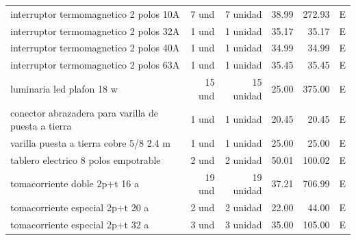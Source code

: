 \begin{longtable}{p{6.0cm}r r r r c}
interruptor termomagnetico 2 polos 10A & 7 und & 7 unidad & 38.99 & 272.93 & E \\
interruptor termomagnetico 2 polos 32A & 1 und & 1 unidad & 35.17 & 35.17 & E \\
interruptor termomagnetico 2 polos 40A & 1 und & 1 unidad & 34.99 & 34.99 & E \\
interruptor termomagnetico 2 polos 63A & 1 und & 1 unidad & 35.45 & 35.45 & E \\
luminaria led plafon 18 w & 15 und & 15 unidad & 25.00 & 375.00 & E \\
conector abrazadera para varilla de puesta a tierra & 1 und & 1 unidad & 20.45 & 20.45 & E \\
varilla puesta a tierra cobre 5/8 2.4 m & 1 und & 1 unidad & 25.00 & 25.00 & E \\
tablero electrico 8 polos empotrable & 2 und & 2 unidad & 50.01 & 100.02 & E \\
tomacorriente doble 2p+t 16 a & 19 und & 19 unidad & 37.21 & 706.99 & E \\
tomacorriente especial 2p+t 20 a & 2 und & 2 unidad & 22.00 & 44.00 & E \\
tomacorriente especial 2p+t 32 a & 3 und & 3 unidad & 35.00 & 105.00 & E \\
\bottomrule\end{longtable}\normalsize

